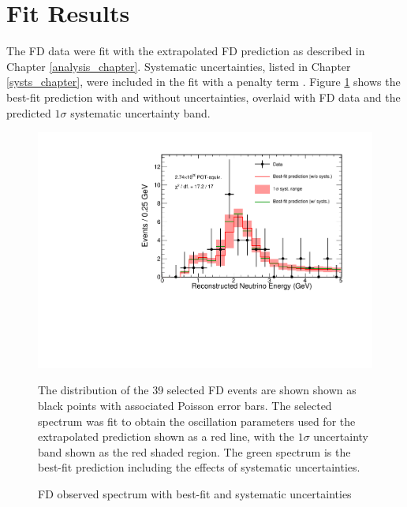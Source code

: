 \clearpage

\section{Fit Results}
\label{fit_results_section}

The FD data were fit with the extrapolated FD prediction
\cite{lozier2015extrap}
as described in Chapter \ref{analysis_chapter}.
Systematic uncertainties, listed in Chapter \ref{systs_chapter},
were included in the fit with a penalty term \cite{pdg,backhouse2015cafana}.
Figure \ref{selected_spectrum_fit_systs} shows the
best-fit prediction with and without uncertainties,
overlaid with FD data and the predicted $1\sigma$ systematic
uncertainty band.

\begin{figure}
\begin{center}
\includegraphics[width=\textwidth]{figures/results/spectrum_fit_systs.pdf}
\end{center}
\caption{FD observed spectrum with best-fit and systematic uncertainties}{
The distribution of the 39 selected FD events are shown shown as black points
with associated Poisson error bars.
The selected spectrum was fit to obtain the oscillation parameters used
for the extrapolated prediction shown as a red line,
with the $1\sigma$ uncertainty band shown as the red shaded region.
The green spectrum is the best-fit prediction including the effects
of systematic uncertainties.
}
\label{selected_spectrum_fit_systs}

\end{figure}



